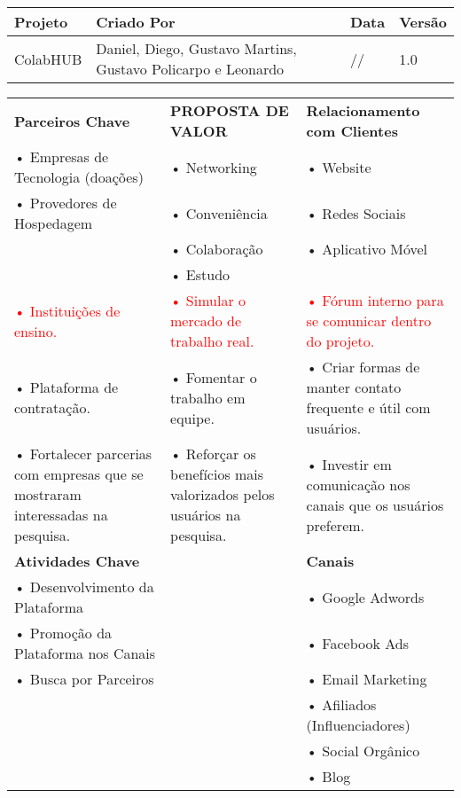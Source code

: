 \documentclass{article}
\newcommand{\hoje}{\number\day/\number\month/\number\year}
\begin{document}
\begin{table}[h!]
\centering
\renewcommand{\arraystretch}{1.3}
\setlength{\tabcolsep}{10pt}
\begin{tabular}{|p{4cm}|p{7cm}|p{3cm}|p{2cm}|}
\hline
\textbf{Projeto} & \textbf{Criado Por} & \textbf{Data} & \textbf{Versão} \\
\hline
ColabHUB & Daniel, Diego, Gustavo Martins, Gustavo Policarpo e Leonardo & \hoje & 1.0 \\
\hline
\end{tabular}
\end{table}

\vspace{0.5cm}

\begin{table}[h!]
\centering
\renewcommand{\arraystretch}{1.8}
\setlength{\tabcolsep}{4pt}
\begin{tabular}{|p{6cm}|p{6cm}|p{6cm}|}
\hline
\rowcolor{lightgray}
\textbf{Parceiros Chave} &
\centering\textbf{PROPOSTA DE VALOR} &
\textbf{Relacionamento com Clientes} \\
\cline{1-1}\cline{2-2}\cline{3-3}
• Empresas de Tecnologia (doações) & • Networking & • Website \\
• Provedores de Hospedagem & • Conveniência & • Redes Sociais \\
& • Colaboração & • Aplicativo Móvel \\
& • Estudo & \\
\textcolor{red}{• Instituições de ensino.} &
\textcolor{red}{• Simular o mercado de trabalho real.} &
\textcolor{red}{• Fórum interno para se comunicar dentro do projeto.} \\
\textcolor{blueval}{• Plataforma de contratação.} &
\textcolor{blueval}{• Fomentar o trabalho em equipe.} &
\textcolor{blueval}{• Criar formas de manter contato frequente e útil com usuários.} \\
\textcolor{greenval}{• Fortalecer parcerias com empresas que se mostraram interessadas na pesquisa.} &
\textcolor{greenval}{• Reforçar os benefícios mais valorizados pelos usuários na pesquisa.} &
\textcolor{greenval}{• Investir em comunicação nos canais que os usuários preferem.} \\
\hline
\rowcolor{lightgray}
\textbf{Atividades Chave} & & \textbf{Canais} \\
\cline{1-1}\cline{2-2}\cline{3-3}
• Desenvolvimento da Plataforma & & • Google Adwords \\
• Promoção da Plataforma nos Canais & & • Facebook Ads \\
• Busca por Parceiros & & • Email Marketing \\
& & • Afiliados (Influenciadores) \\
& & • Social Orgânico \\
& & • Blog \\


\end{tabular}
\end{table}
\end{document}
